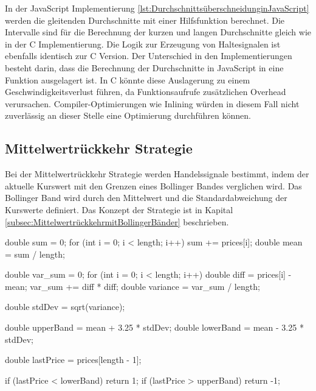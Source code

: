 In der JavaScript Implementierung \ref{lst:DurchschnittsüberschneidunginJavaScript} werden die gleitenden Durchschnitte mit einer Hilfsfunktion berechnet.
Die Intervalle sind für die Berechnung der kurzen und langen Durchschnitte gleich wie in der C Implementierung.
Die Logik zur Erzeugung von Haltesignalen ist ebenfalls identisch zur C Version.
Der Unterschied in den Implementierungen besteht darin, dass die Berechnung der Durchschnitte in JavaScript in eine Funktion ausgelagert ist.
In C könnte diese Auslagerung zu einem Geschwindigkeitsverlust führen, da Funktionsaufrufe zusätzlichen Overhead verursachen.
Compiler-Optimierungen wie Inlining würden in diesem Fall nicht zuverlässig an dieser Stelle eine Optimierung durchführen können.
\cite{10.1145/3611643.3616311}

\subsection{Mittelwertrückkehr Strategie}
\label{subsec:MittelwertrückkehrStrategie}

Bei der Mittelwertrückkehr Strategie werden Handelssignale bestimmt, indem der aktuelle Kurswert mit den Grenzen eines Bollinger Bandes verglichen wird.
Das Bollinger Band wird durch den Mittelwert und die Standardabweichung der Kurswerte definiert.
Das Konzept der Strategie ist in Kapital \ref{subsec:MittelwertrückkehrmitBollingerBänder} beschrieben.

\begin{CCode}[caption={Mittelwertrückkehr in C}, label={lst:MittelwertrückkehrinC}]
    double sum = 0;
    for (int i = 0; i < length; i++) {
    sum += prices[i];
    }
    double mean = sum / length;

    double var_sum = 0;
    for (int i = 0; i < length; i++) {
        double diff = prices[i] - mean;
        var_sum += diff * diff;
    }
    double variance = var_sum / length;

    double stdDev = sqrt(variance);

    double upperBand = mean + 3.25 * stdDev;
    double lowerBand = mean - 3.25 * stdDev;

    double lastPrice = prices[length - 1];

    if (lastPrice < lowerBand) {
        return 1;
    }
    if (lastPrice > upperBand) {
        return -1;
    }
\end{CCode}

